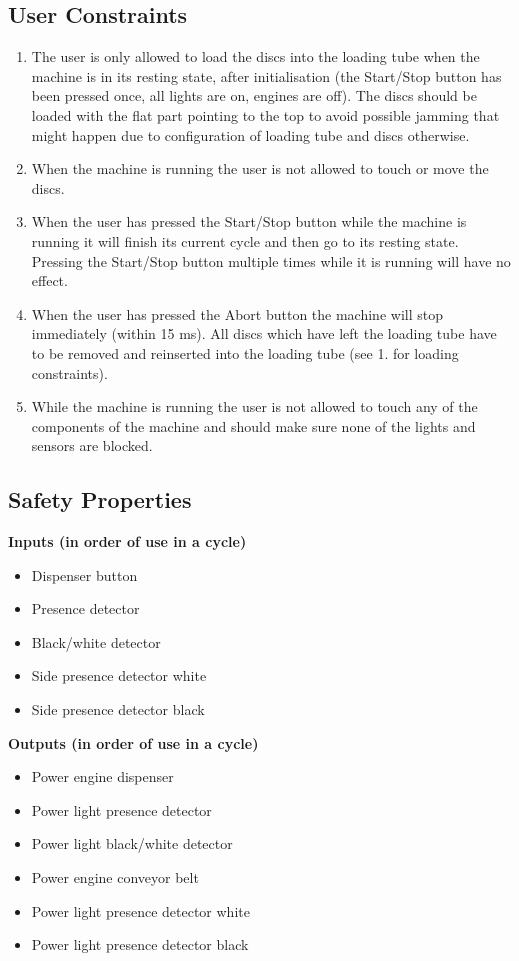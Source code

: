 \documentclass[a4paper,oneside,11pt]{report}
\begin{document}
\subsection{User Constraints}
\begin{enumerate}
\item The user is only allowed to load the discs into the loading tube when the machine is in its resting state, after initialisation (the Start/Stop button has been pressed once, all lights are on, engines are off). The discs should be loaded with the flat part pointing to the top to avoid possible jamming that might happen due to configuration of loading tube and discs otherwise.
\item When the machine is running the user is not allowed to touch or move the discs.
\item When the user has pressed the Start/Stop button while the machine is running it will finish its current cycle and then go to its resting state. Pressing the Start/Stop button multiple times while it is running will have no effect.
\item When the user has pressed the Abort button the machine will stop immediately (within 15 ms). All discs which have left the loading tube have to be removed and reinserted into the loading tube (see 1. for loading constraints).
\item While the machine is running the user is not allowed to touch any of the components of the machine and should make sure none of the lights and sensors are blocked.
\end{enumerate}

\subsection{Safety Properties}
\textbf{Inputs (in order of use in a cycle)}
\begin{itemize}
\item Dispenser button
\item Presence detector
\item Black/white detector
\item Side presence detector white
\item Side presence detector black
\end{itemize}

\textbf{Outputs (in order of use in a cycle)}
\begin{itemize}
\item Power engine dispenser
\item Power light presence detector
\item Power light black/white detector
\item Power engine conveyor belt
\item Power light presence detector white
\item Power light presence detector black
\end{itemize}
\end{document}

